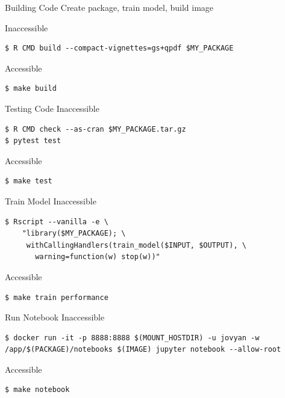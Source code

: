\documentclass{beamer}
\begin{document}
\begin{frame}[fragile]{Building Code}
Create package, train model, build image

Inaccessible
\begin{lstlisting}[style=custombash]
$ R CMD build --compact-vignettes=gs+qpdf $MY_PACKAGE
\end{lstlisting}

Accessible
\begin{lstlisting}[style=custombash]
$ make build
\end{lstlisting}
\end{frame}



\begin{frame}[fragile]{Testing Code}
Inaccessible
\begin{lstlisting}[style=custombash]
$ R CMD check --as-cran $MY_PACKAGE.tar.gz
$ pytest test
\end{lstlisting}

Accessible
\begin{lstlisting}[style=custombash]
$ make test
\end{lstlisting}

\end{frame}



\begin{frame}[fragile]{Train Model}
Inaccessible
\begin{lstlisting}[style=custombash]
$ Rscript --vanilla -e \
    "library($MY_PACKAGE); \
     withCallingHandlers(train_model($INPUT, $OUTPUT), \
       warning=function(w) stop(w))"
\end{lstlisting}

Accessible
\begin{lstlisting}[style=custombash]
$ make train performance
\end{lstlisting}

\end{frame}


\begin{frame}[fragile]{Run Notebook}
Inaccessible
\begin{lstlisting}[style=custombash]
$ docker run -it -p 8888:8888 $(MOUNT_HOSTDIR) -u jovyan -w /app/$(PACKAGE)/notebooks $(IMAGE) jupyter notebook --allow-root
\end{lstlisting}

Accessible
\begin{lstlisting}[style=custombash]
$ make notebook
\end{lstlisting}

\end{frame}
\end{document}
